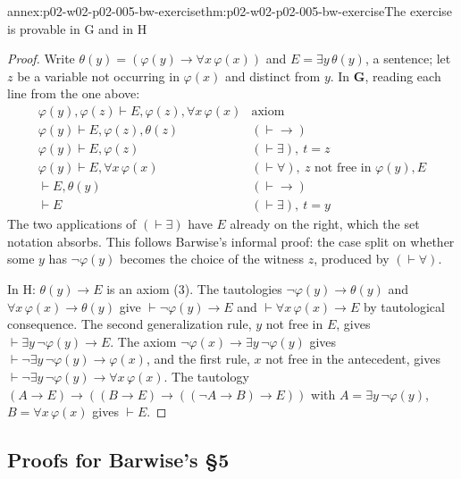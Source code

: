 \begin{annexitem}{annex:p02-w02-p02-005-bw-exercise}{thm:p02-w02-p02-005-bw-exercise}{The exercise is provable in G and in H}
\begin{proof}
Write \(\theta(y)=(\varphi(y)\to\forall x\,\varphi(x))\) and
\(E=\exists y\,\theta(y)\), a sentence; let \(z\) be a variable not
occurring in \(\varphi(x)\) and distinct from \(y\).  In \(\mathbf G\),
reading each line from the one above:
\[
\begin{array}{ll}
\varphi(y),\varphi(z)\vdash E,\varphi(z),\forall x\,\varphi(x) & \text{axiom}\\
\varphi(y)\vdash E,\varphi(z),\theta(z) & (\vdash\to)\\
\varphi(y)\vdash E,\varphi(z) & (\vdash\exists),\ t=z\\
\varphi(y)\vdash E,\forall x\,\varphi(x) & (\vdash\forall),\ z\text{ not free in }\varphi(y),E\\
\vdash E,\theta(y) & (\vdash\to)\\
\vdash E & (\vdash\exists),\ t=y
\end{array}
\]
The two applications of \((\vdash\exists)\) have \(E\) already on the
right, which the set notation absorbs.  This follows Barwise's informal
proof: the case split on whether some \(y\) has \(\neg\varphi(y)\) becomes
the choice of the witness \(z\), produced by \((\vdash\forall)\).

In H: \(\theta(y)\to E\) is an axiom (3).  The tautologies
\(\neg\varphi(y)\to\theta(y)\) and \(\forall x\,\varphi(x)\to\theta(y)\)
give \(\vdash\neg\varphi(y)\to E\) and \(\vdash\forall x\,\varphi(x)\to E\)
by tautological consequence.  The second generalization rule, \(y\) not
free in \(E\), gives \(\vdash\exists y\,\neg\varphi(y)\to E\).  The axiom
\(\neg\varphi(x)\to\exists y\,\neg\varphi(y)\) gives
\(\vdash\neg\exists y\,\neg\varphi(y)\to\varphi(x)\), and the first rule,
\(x\) not free in the antecedent, gives
\(\vdash\neg\exists y\,\neg\varphi(y)\to\forall x\,\varphi(x)\).  The
tautology \((A\to E)\to((B\to E)\to((\neg A\to B)\to E))\) with
\(A=\exists y\,\neg\varphi(y)\), \(B=\forall x\,\varphi(x)\) gives
\(\vdash E\).
\end{proof}
\end{annexitem}

\subsection{Proofs for Barwise's \S5}
\label{sec:annex-p02-w02-p02-005-bw-s5}

